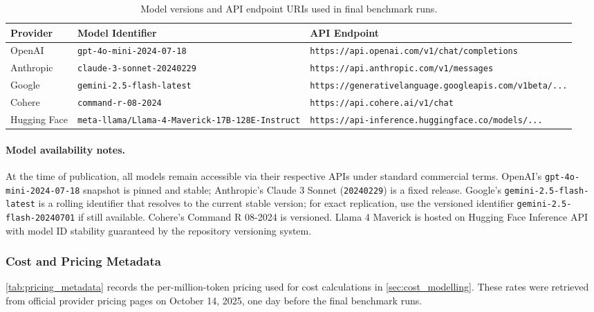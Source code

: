 \begin{table}[h!]
\centering
\caption{Model versions and API endpoint URIs used in final benchmark runs.\label{tab:model_versions_endpoints}}
\begin{tabularx}{\textwidth}{@{}l l X@{}}
\toprule
\textbf{Provider} & \textbf{Model Identifier} & \textbf{API Endpoint} \\
\midrule
OpenAI & \texttt{gpt-4o-mini-2024-07-18} & \texttt{https://api.openai.com/v1/chat/completions} \\
Anthropic & \texttt{claude-3-sonnet-20240229} & \texttt{https://api.anthropic.com/v1/messages} \\
Google & \texttt{gemini-2.5-flash-latest} & \texttt{https://generativelanguage.googleapis.com/v1beta/...} \\
Cohere & \texttt{command-r-08-2024} & \texttt{https://api.cohere.ai/v1/chat} \\
Hugging Face & \texttt{meta-llama/Llama-4-Maverick-17B-128E-Instruct} & \texttt{https://api-inference.huggingface.co/models/...} \\
\bottomrule
\end{tabularx}
\end{table}

\paragraph{Model availability notes.} At the time of publication, all models remain accessible via their respective APIs under standard commercial terms. OpenAI's \texttt{gpt-4o-mini-2024-07-18} snapshot is pinned and stable; Anthropic's Claude 3 Sonnet (\texttt{20240229}) is a fixed release. Google's \texttt{gemini-2.5-flash-latest} is a rolling identifier that resolves to the current stable version; for exact replication, use the versioned identifier \texttt{gemini-2.5-flash-20240701} if still available. Cohere's Command R 08-2024 is versioned. Llama 4 Maverick is hosted on Hugging Face Inference API with model ID stability guaranteed by the repository versioning system.

\subsubsection{Cost and Pricing Metadata}

\cref{tab:pricing_metadata} records the per-million-token pricing used for cost calculations in \cref{sec:cost_modelling}. These rates were retrieved from official provider pricing pages on October 14, 2025, one day before the final benchmark runs.


